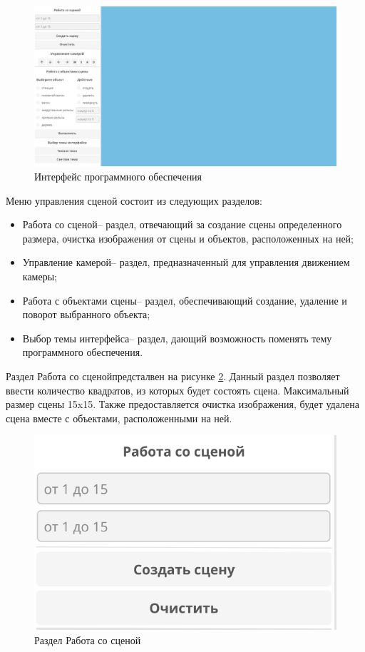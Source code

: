 \clearpage
\begin{figure}[h]
    \includegraphics[width=1\linewidth]{img/inter.png}
    \caption{Интерфейс программного обеспечения}
    \label{img:inter}
\end{figure}
\noindent

Меню управления сценой состоит из следующих разделов:
\begin{itemize}
    \item \guillemotleft Работа со сценой\guillemotright-- раздел, отвечающий за создание сцены 
    определенного размера, очистка изображения от сцены и объектов, расположенных на ней;
    \item \guillemotleft Управление камерой\guillemotright -- раздел, предназначенный для управления движением камеры;
    \item \guillemotleft Работа с объектами сцены\guillemotright -- раздел, обеспечивающий создание, удаление и поворот выбранного объекта;
    \item \guillemotleft Выбор темы интерфейса\guillemotright -- раздел, дающий возможность поменять тему программного обеспечения. 
\end{itemize}

Раздел \guillemotleft Работа со сценой\guillemotright предсталвен на рисунке \ref{img:entry}. Данный раздел позволяет 
ввести количество квадратов, из которых будет состоять сцена. Максимальный размер сцены 15x15. Также предоставляется очистка изображения, будет удалена
сцена вместе с объектами, расположенными на ней.

\clearpage
\begin{figure}[h]
    \centering
    \includegraphics[width=0.5\linewidth]{img/entry.png}
    \caption{Раздел \guillemotleft Работа со сценой\guillemotright}
    \label{img:entry}
\end{figure}
\noindent

